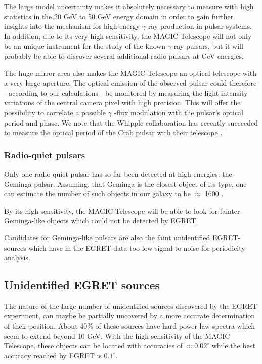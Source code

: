 The large model uncertainty
makes it absolutely necessary to measure with high statistics
in the 20 GeV to 50 GeV energy domain in order to gain further insights into the
mechanism for high energy $\gamma$-ray production in pulsar systems.
In addition, due
to its very high sensitivity, the MAGIC Telescope will not only be an unique
instrument for the study of the known $\gamma$-ray pulsars, but it will probably be able to
discover several additional radio-pulsars at GeV energies.

The huge mirror area also makes the MAGIC Telescope an optical telescope
with a very large aperture. The optical emission of the observed pulsar
could therefore - according to our calculations - be monitored by measuring
the light intensity variations of the central camera pixel with high
precision. This will offer the possibility to correlate a possible $\gamma$%
-flux modulation with the pulsar's optical period and phase. We note that
the Whipple collaboration has recently succeeded to measure the optical
period of the Crab pulsar with their \Cerenkov telescope \cite{weekes:97}.

\vspace{1cm}

\subsubsection{Radio-quiet pulsars}

\medskip Only one radio-quiet pulsar has so far been detected at high energies: the
Geminga pulsar. Assuming, that Geminga is the closest object of its type,
one can estimate the number of such objects in our galaxy to be $\approx$
1600 \cite{kaul:97}.

By its high sensitivity, the MAGIC Telescope will be able to look for
fainter Geminga-like objects which could not be detected by EGRET.

Candidates for Geminga-like pulsars are also the faint unidentified
EGRET-sources which have in the EGRET-data too low signal-to-noise for
periodicity analysis.
\vfill

\subsection{Unidentified EGRET sources}

\medskip The nature of the large number of unidentified sources discovered by the
EGRET experiment, can maybe be partially uncovered by a more accurate
determination of their position. About 40\% of these sources have hard
power law spectra which seem to extend beyond 10 GeV. With the high
sensitivity of the MAGIC Telescope, these objects can be located with
accuracies of $\approx 0.02^\circ$ while the best accuracy reached by EGRET
is $0.1^\circ$.

